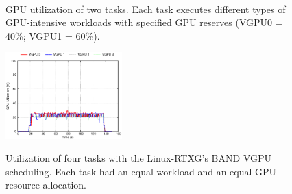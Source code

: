 \begin{figure}[!t]
\begin{minipage}[t]{0.33\hsize}
\begin{center}
\label{fig:band_rtx}
\label{fig:rtx_nouveau}
\end{center}
\end{minipage}
\begin{minipage}[t]{0.33\hsize}
\begin{center}
\label{fig:fifo_gdev} \\
\label{fig:band_gdev}
\label{fig:gdev_usage}
\end{center}
\end{minipage}
\caption{GPU utilization of two tasks. Each task executes different types of GPU-intensive workloads with specified GPU reserves (VGPU0 = 40\%; VGPU1 = 60\%).}
\vspace{-3mm}
\label{fig:utilize}
\end{figure}

\begin{figure}[!t]
\begin{center}
\includegraphics[width=0.4\textwidth]{img/band_rtx_fair}
\caption{Utilization of four tasks with the Linux-RTXG's BAND VGPU scheduling. Each task had an equal workload and an equal GPU-resource allocation.}
\vspace{-4mm}
\label{fig:band_rtx_fair}
\end{center}
\end{figure}

